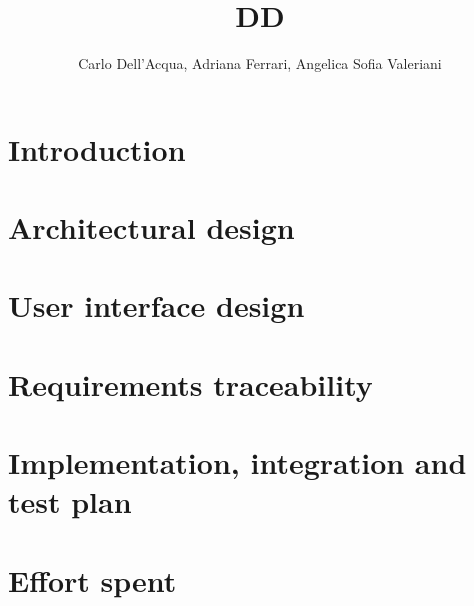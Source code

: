 \documentclass[a4paper]{report}
\title{DD}
\author{Carlo Dell'Acqua, Adriana Ferrari, Angelica Sofia Valeriani}
\begin{document}
  \maketitle

  \tableofcontents

  \chapter{Introduction}
  

  \chapter{Architectural design}
  

  \chapter{User interface design}
  
  
  \chapter{Requirements traceability}
  

  \chapter{Implementation, integration and test plan}
  
  
  \chapter{Effort spent}
  

  
\end{document}

